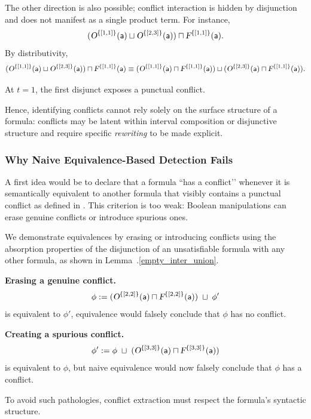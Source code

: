 The other direction is also possible; conflict interaction is hidden by disjunction and does not manifest as a single product term. For instance,
\[
(\textsl{O}^{\{[1,1]\}}(\mathsf{a}) \sqcup \textsl{O}^{\{[2,3]\}}(\mathsf{a})) \sqcap \textsl{F}^{\{[1,1]\}}(\mathsf{a}).
\]
By distributivity,
$$
(\textsl{O}^{\{[1,1]\}}(\mathsf{a}) \sqcup \textsl{O}^{\{[2,3]\}}(\mathsf{a})) \sqcap \textsl{F}^{\{[1,1]\}}(\mathsf{a})
\equiv
(\textsl{O}^{\{[1,1]\}}(\mathsf{a}) \sqcap \textsl{F}^{\{[1,1]\}}(\mathsf{a}))
\sqcup
(\textsl{O}^{\{[2,3]\}}(\mathsf{a}) \sqcap \textsl{F}^{\{[1,1]\}}(\mathsf{a})).
$$

At $t=1$, the first disjunct exposes a punctual conflict. 

Hence, identifying conflicts cannot rely solely on the surface structure of a formula: conflicts may be latent within interval composition or disjunctive structure and require specific \emph{rewriting} to be made explicit.

\subsubsection{Why Naive Equivalence-Based Detection Fails}

A first idea would be to declare that a formula “has a conflict’’ whenever it is semantically equivalent to another formula that visibly contains a punctual conflict as defined in \cite{DBLP:conf/jurix/KharrazSL24}. This criterion is too weak: Boolean manipulations can erase genuine conflicts or introduce spurious ones.

\begin{example}
We demonstrate equivalences by erasing or introducing conflicts using the absorption properties of the disjunction of an unsatisfiable formula with any other formula, as shown in Lemma~.\ref{empty_inter_union}.
\begin{inparaenum}[(i)]
\item \textbf{Erasing a genuine conflict.}
\[
  \phi := (\textsl{O}^{\{[2,2]\}}(\mathsf{a}) \sqcap \textsl{F}^{\{[2,2]\}}(\mathsf{a})) \;\sqcup\; \phi'
\]
is equivalent to $\phi'$,  equivalence would falsely conclude that $\phi$ has no conflict.

\item \textbf{Creating a spurious conflict.}
\[
  \phi' := \phi \;\sqcup\; (\textsl{O}^{\{[3,3]\}}(\mathsf{a}) \sqcap \textsl{F}^{\{[3,3]\}}(\mathsf{a}))
\]
is equivalent to $\phi$, but naive equivalence would now falsely conclude that $\phi$ has a conflict.
\end{inparaenum}
\end{example}

To avoid such pathologies, conflict extraction must respect the formula's syntactic structure.

